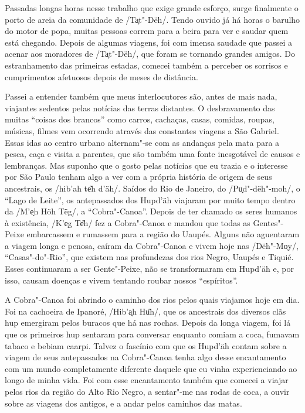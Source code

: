 Passadas longas horas nesse trabalho que exige grande esforço, surge
finalmente o porto de areia da comunidade de /Ta̗t"-Dëh/. Tendo ouvido já
há horas o barulho do motor de popa, muitas pessoas correm para a beira
para ver e saudar quem está chegando. Depois de algumas viagens, foi com
imensa saudade que passei a acenar aos moradores de /Ta̗t"-Dëh/, que foram
se tornando grandes amigos. Do estranhamento das primeiras estadas,
comecei também a perceber os sorrisos e cumprimentos afetuosos depois de
meses de distância.

Passei a entender também que meus interlocutores são, antes de mais
nada, viajantes sedentos pelas notícias das terras distantes. O
desbravamento das muitas ``coisas dos brancos'' como carros, cachaças,
casas, comidas, roupas, músicas, filmes vem ocorrendo através das
constantes viagens a São Gabriel. Essas idas ao centro urbano
alternam"-se com as andanças pela mata para a pesca, caça e visita a
parentes, que são também uma fonte inesgotável de causos e lembranças.
Mas suponho que o gosto pelas notícias que eu trazia e o interesse por
São Paulo tenham algo a ver com a própria história de origem de seus
ancestrais, os /hib'ah te͂h d'äh/. Saídos do Rio de Janeiro, do
/Pu̗d"-dëh"-moh/, o ``Lago de Leite'', os antepassados dos Hupd'äh viajaram
por muito tempo dentro da /M'e̖h Hõh Tëg/, a ``Cobra"-Canoa''. Depois de
ter chamado os seres humanos à existência, /K'e̖g Te͂h/ fez a Cobra"-Canoa
e mandou que todas as Gentes"-Peixe embarcassem e rumassem para a região
do Uaupés. Alguns não aguentaram a viagem longa e penosa, caíram da
Cobra"-Canoa e vivem hoje nas /Dëh"-Mo̖y/, ``Casas"-do"-Rio'', que existem
nas profundezas dos rios Negro, Uaupés e Tiquié. Esses continuaram a ser
Gente"-Peixe, não se transformaram em Hupd'äh e, por isso, causam doenças
e vivem tentando roubar nossos ``espíritos''.

A Cobra"-Canoa foi abrindo o caminho dos rios pelos quais viajamos hoje
em dia. Foi na cachoeira de Ipanoré, /Hib'a̖h Hu͂h/, que os ancestrais dos
diversos clãs hup emergiram pelos buracos que há nas rochas. Depois da
longa viagem, foi lá que os primeiros hup sentaram para conversar
enquanto comiam a coca, fumavam tabaco e bebiam caarpi. Talvez o
fascínio com que os Hupd'äh contam sobre a viagem de seus antepassados
na Cobra"-Canoa tenha algo desse encantamento com um mundo completamente
diferente daquele que eu vinha experienciando ao longo de minha vida.
Foi com esse encantamento também que comecei a viajar pelos rios da
região do Alto Rio Negro, a sentar"-me nas rodas de coca, a ouvir sobre
as viagens dos antigos, e a andar pelos caminhos das matas.

